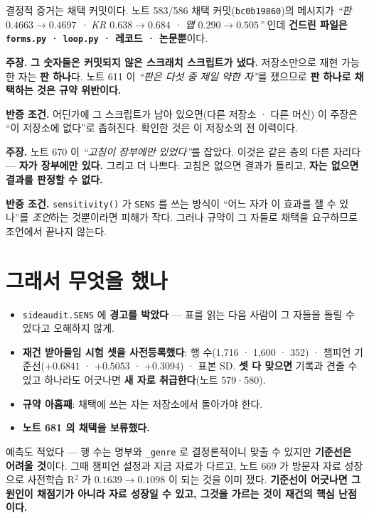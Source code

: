 \documentclass[10pt,a4paper]{article}
\newcommand{\claim}[2]{\begin{claimbox}\textbf{주장.} #1\par\smallskip
  \textcolor{gray!70}{\textbf{반증 조건.} #2}\end{claimbox}}
\begin{document}
결정적 증거는 채택 커밋이다. 노트 583/586 채택 커밋(\verb|bc0b19860|)의 메시지가
\emph{``판 $0.4663 \to 0.4697$ · KR $0.638 \to 0.684$ · 앱 $0.290 \to 0.505$''} 인데
\textbf{건드린 파일은 \texttt{forms.py} · \texttt{loop.py} · 레코드 · 논문뿐}이다.

\claim{\textbf{그 숫자들은 커밋되지 않은 스크래치 스크립트가 냈다.} 저장소만으로
재현 가능한 자는 \textbf{판 하나}다. 노트 611 이 \emph{``판은 다섯 중 제일 약한
자''}를 쟀으므로 \textbf{판 하나로 채택하는 것은 규약 위반이다.}}
{어딘가에 그 스크립트가 남아 있으면(다른 저장소 · 다른 머신) 이 주장은 ``이
저장소에 없다''로 좁혀진다. 확인한 것은 이 저장소의 전 이력이다.}

\claim{노트 670 이 \emph{``고침이 장부에만 있었다''}를 잡았다. 이것은 같은 층의 다른
자리다 --- \textbf{자가 장부에만 있다.} 그리고 더 나쁘다: 고침은 없으면 결과가
틀리고, \textbf{자는 없으면 결과를 판정할 수 없다.}}
{\texttt{sensitivity()} 가 \texttt{SENS} 를 쓰는 방식이 ``어느 자가 이 효과를 잴 수
있나''를 \emph{조언}하는 것뿐이라면 피해가 작다. 그러나 규약이 그 자들로 채택을
요구하므로 조언에서 끝나지 않는다.}

\section{그래서 무엇을 했나}

\begin{itemize}
\item \verb|sideaudit.SENS| 에 \textbf{경고를 박았다} --- 표를 읽는 다음 사람이 그
      자들을 돌릴 수 있다고 오해하지 않게.
\item \textbf{재건 받아들임 시험 셋을 사전등록했다}: 행 수(1{,}716 · 1{,}600 · 352) ·
      챔피언 기준선($+0.6841$ · $+0.5053$ · $+0.3094$) · 표본 SD. \textbf{셋 다 맞으면}
      기록과 견줄 수 있고 하나라도 어긋나면 \textbf{새 자로 취급한다}(노트 579·580).
\item \textbf{규약 아홉째}: 채택에 쓰는 자는 저장소에서 돌아가야 한다.
\item \textbf{노트 681 의 채택을 보류했다.}
\end{itemize}

예측도 적었다 --- 행 수는 명부와 \verb|_genre| 로 결정론적이니 맞출 수 있지만
\textbf{기준선은 어려울 것}이다. 그때 챔피언 설정과 지금 자료가 다르고, 노트 669 가
방문자 자료 성장으로 사전학습 R$^2$ 가 $0.1639 \to 0.1098$ 이 되는 것을 이미 쟀다.
\textbf{기준선이 어긋나면 그 원인이 채점기가 아니라 자료 성장일 수 있고, 그것을
가르는 것이 재건의 핵심 난점이다.}
\end{document}

